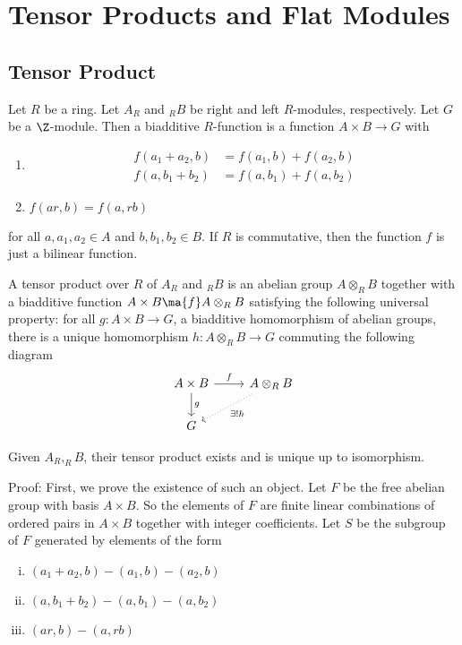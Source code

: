 
\newpage
\section{Tensor Products and Flat Modules}

\subsection{Tensor Product}

\begin{dfn}
Let $R$ be a ring. Let $A_R$ and $_R B$ be right and left $R$-modules, respectively. Let $G$ be a $\Z$-module. Then a biadditive $R$-function is a function $A \times B \rightarrow G$ with
\begin{enumerate}[1.]
\item
\[
\begin{split}
f(a_1+a_2,b)&=f(a_1,b)+f(a_2,b) \\
f(a,b_1+b_2)&=f(a,b_1)+f(a,b_2)
\end{split}
\]
\item $f(ar,b)=f(a,rb)$
\end{enumerate}
for all $a,a_1,a_2 \in A$ and $b,b_1,b_2 \in B$. If $R$ is commutative, then the function $f$ is just a bilinear function. 
\end{dfn}

\begin{dfn}
A tensor product over $R$ of $A_R$ and $_R B$ is an abelian group $A \otimes_R B$ together with a biadditive function $A \times B \ma{f} A \otimes_R B$ satisfying the following universal property: for all $g: A \times B \rightarrow G$, a biadditive homomorphism of abelian groups, there is a unique homomorphism $h: A \otimes_R B \rightarrow G$ commuting the following diagram
\[
\begin{tikzcd}
A \times B \arrow{r}{f} \arrow{d}{g} & A \otimes_R B \arrow[dotted]{dl}{\exists! h} \\
G & 
\end{tikzcd}
\]
\end{dfn}

\begin{thm}
Given $A_R,_R B$, their tensor product exists and is unique up to isomorphism.
\end{thm}

Proof: First, we prove the existence of such an object. Let $F$ be the free abelian group with basis $A \times B$. So the elements of $F$ are finite linear combinations of ordered pairs in $A \times B$ together with integer coefficients. Let $S$ be the subgroup of $F$ generated by elements of the form
\begin{enumerate}[(i)]
\item $(a_1+a_2,b)-(a_1,b)-(a_2,b)$
\item $(a,b_1+b_2)-(a,b_1)-(a,b_2)$
\item $(ar,b)-(a,rb)$
\end{enumerate}


